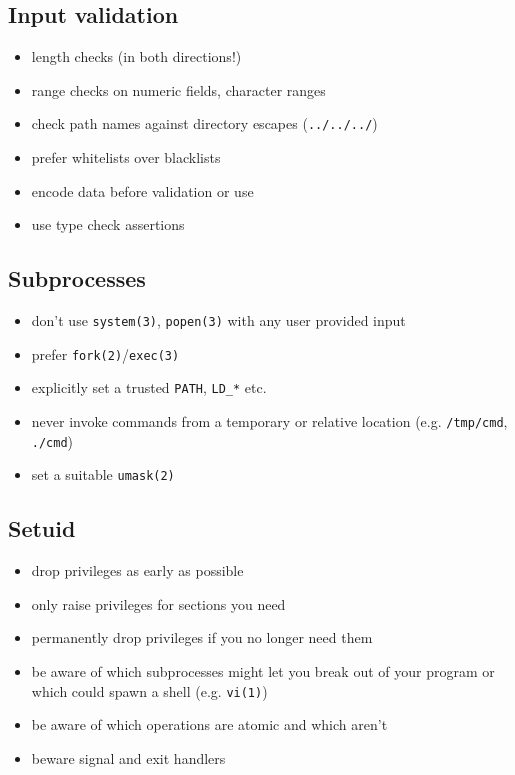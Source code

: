 \documentclass[xga]{xdvislides}
\begin{document}
\subsection{Input validation}
\begin{itemize}
	\item length checks (in both directions!)
	\item range checks on numeric fields, character ranges
	\item check path names against directory escapes (\verb+../../../+)
	\item prefer whitelists over blacklists
	\item encode data before validation or use
	\item use type check assertions
\end{itemize}

\subsection{Subprocesses}
\begin{itemize}
	\item don't use \verb+system(3)+, \verb+popen(3)+ with any user provided input
	\item prefer \verb+fork(2)+/\verb+exec(3)+
	\item explicitly set a trusted \verb+PATH+, \verb+LD_*+ etc.
	\item never invoke commands from a temporary or relative location (e.g. \verb+/tmp/cmd+, \verb+./cmd+)
	\item set a suitable \verb+umask(2)+
\end{itemize}

\subsection{Setuid}
\begin{itemize}
	\item drop privileges as early as possible
	\item only raise privileges for sections you need
	\item permanently drop privileges if you no longer need them
	\item be aware of which subprocesses might let you break out of your program or which could spawn a shell (e.g. \verb+vi(1)+)
	\item be aware of which operations are atomic and which aren't
	\item beware signal and exit handlers
\end{itemize}
\end{document}
